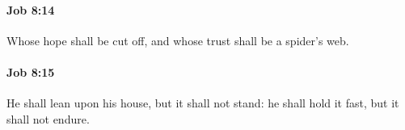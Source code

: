 		\paragraph{Job 8:14} %
			\label{JOB-8-14}

			Whose hope shall be cut off, and whose trust shall be a spider’s web.


		\paragraph{Job 8:15} %
			\label{JOB-8-15}

			He shall lean upon his house, but it shall not stand: he shall hold it fast, but it shall not endure.


